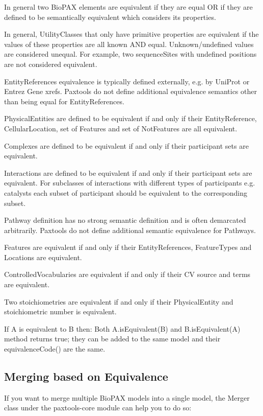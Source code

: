\documentclass{tufte-book}
\begin{document}
\begin{description}

  \item In general two BioPAX elements are equivalent if they are equal OR if they are defined to be semantically equivalent which considers its properties.
  \item In general, UtilityClasses that only have primitive properties are equivalent if the values of these properties are all known AND equal. Unknown/undefined values are considered unequal. For example, two sequenceSites with undefined  positions are not considered equivalent. 
  \item EntityReferences  equivalence is typically defined externally, e.g. by UniProt or Entrez Gene xrefs. Paxtools do not define additional equivalence semantics other than being equal for EntityReferences.
  \item PhysicalEntities are defined to be equivalent if and only if their EntityReference, CellularLocation, set of Features and set of NotFeatures are all equivalent. 
  \item Complexes are defined to be equivalent if and only if their participant sets are equivalent.
  \item Interactions are defined to be equivalent if and only if their participant sets are equivalent. For subclasses of interactions with different types of participants e.g. catalysts each subset of participant should be equivalent to the corresponding subset.
  \item Pathway definition has no strong semantic definition and is often demarcated arbitrarily. Paxtools do not define additional semantic equivalence for Pathways.
  \item Features are equivalent if and only if their EntityReferences, FeatureTypes and Locations are equivalent.
  \item ControlledVocabularies are equivalent if and only if their CV source and terms are equivalent.
  \item Two stoichiometries are equivalent if and only if their PhysicalEntity and stoichiometric number is equivalent.

\end{description}
If A is equivalent to B then: Both A.isEquivalent(B) and B.isEquivalent(A) method returns true; they can be added to the same model and their equivalenceCode() are the same.

\subsection{Merging based on Equivalence}
If you want to merge multiple BioPAX models into a single model, the Merger class under the paxtools-core module can help you to do so:
\end{document}
